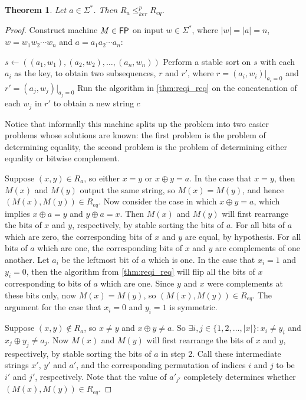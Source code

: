 \documentclass{amsart}
\newtheorem{theorem}{Theorem}[section]
\theoremstyle{definition} \newtheorem{definition}[definition]{Definition}
\newcommand{\sigmastar}{\Sigma^{*}} %
\newcommand{\kr}{\leq^{p}_{ker}} %
\begin{document}
\begin{theorem}Let $a\in\sigmastar$. Then $R_a\kr R_{eq}$.\end{theorem}
\begin{proof}
  Construct machine $M\in{\ensuremath{\mathsf{FP}}}$ on input $w\in\sigmastar$, where $|w|=|a|=n$,
  $w=w_1w_2\cdots w_n$ and $a=a_1a_2\cdots a_n$:\\
  \begin{algorithm}[H]
    $s\gets((a_1, w_1), (a_2, w_2), \ldots, (a_n, w_n))$\;
    Perform a stable sort on $s$ with each $a_i$ as the key, to obtain two
    subsequences, $r$ and $r'$, where $r=(a_i, w_i)|_{a_i=0}$ and $r'=(a_j,
    w_j)|_{a_j=0}$\;
    Run the algorithm in \autoref{thm:reqi_req} on the concatenation of each
    $w_j$ in $r'$ to obtain a new string $c$\;
  \end{algorithm}
  Notice that informally this machine splits up the problem into two easier
  problems whose solutions are known: the first problem is the problem of
  determining equality, the second problem is the problem of determining either
  equality or bitwise complement.

  Suppose $(x,y)\in R_a$, so either $x=y$ or $x\oplus y=a$. In the case that
  $x=y$, then $M(x)$ and $M(y)$ output the same string, so $M(x)=M(y)$, and
  hence $(M(x),M(y))\in R_{eq}$. Now consider the case in which $x\oplus y=a$,
  which implies $x\oplus a=y$ and $y\oplus a=x$. Then $M(x)$ and $M(y)$ will
  first rearrange the bits of $x$ and $y$, respectively, by stable sorting the
  bits of $a$. For all bits of $a$ which are zero, the corresponding bits of
  $x$ and $y$ are equal, by hypothesis. For all bits of $a$ which are one, the
  corresponding bits of $x$ and $y$ are complements of one another. Let $a_i$
  be the leftmost bit of $a$ which is one. In the case that $x_i=1$ and
  $y_i=0$, then the algorithm from \autoref{thm:reqi_req} will flip all the
  bits of $x$ corresponding to bits of $a$ which are one. Since $y$ and $x$
  were complements at these bits only, now $M(x)=M(y)$, so $(M(x),M(y))\in
  R_{eq}$. The argument for the case that $x_i=0$ and $y_i=1$ is symmetric.

  Suppose $(x,y)\notin R_a$, so $x\neq y$ and $x\oplus y\neq a$. So $\exists
  i,j\in\{1,2,\ldots,|x|\}: x_i\neq y_i$ and $x_j\oplus y_j\neq a_j$. Now
  $M(x)$ and $M(y)$ will first rearrange the bits of $x$ and $y$, respectively,
  by stable sorting the bits of $a$ in step 2. Call these intermediate strings
  $x'$, $y'$ and $a'$, and the corresponding permutation of indices $i$ and $j$
  to be $i'$ and $j'$, respectively. Note that the value of $a'_{j'}$
  completely determines whether $(M(x),M(y))\in R_{eq}$.


\end{proof}
\end{document}
